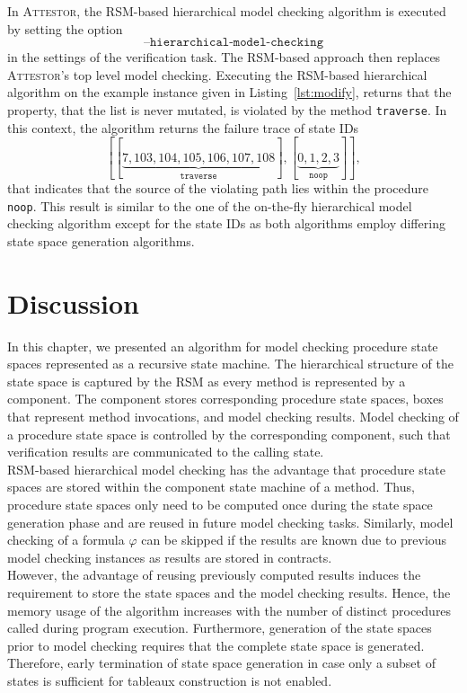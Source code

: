 \documentclass[a4paper, 12pt, twoside]{report}
\begin{document}
	In \textsc{Attestor}, the RSM-based hierarchical model checking algorithm is executed by setting the option \[\texttt{--hierarchical-model-checking}\] in the settings of the verification task. The RSM-based approach then replaces \textsc{Attestor}'s top level model checking.  Executing the RSM-based hierarchical algorithm on the example instance given in Listing~\ref{lst:modify}, returns that the property, that the list is never mutated, is violated by the method \texttt{traverse}. In this context, the algorithm returns the failure trace of state IDs \[[[\underbrace{7, 103, 104, 105, 106, 107, 108}_{\texttt{traverse}}], [\underbrace{0, 1, 2, 3}_{\texttt{noop}}]],\] that indicates that the source of the violating path lies within the procedure \texttt{noop}. This result is similar to the one of the on-the-fly hierarchical model checking algorithm except for the state IDs as both algorithms employ differing state space generation algorithms. 
	
	\section{Discussion}
	
	In this chapter, we presented an algorithm for model checking procedure state spaces represented as a recursive state machine. The hierarchical structure of the state space is captured by the RSM as every method is represented by a component. The component stores corresponding procedure state spaces, boxes that represent method invocations, and model checking results. Model checking of a procedure state space is controlled by the corresponding component, such that verification results are communicated to the calling state. \\
	
	RSM-based hierarchical model checking has the advantage that procedure state spaces are stored within the component state machine of a method. Thus, procedure state spaces only need to be computed once during the state space generation phase and are reused in future model checking tasks. Similarly, model checking of a formula $\varphi$ can be skipped if the results are known due to previous model checking instances as results are stored in contracts.\\	
	
	However, the advantage of reusing previously computed results induces the requirement to store the state spaces and the model checking results. Hence, the memory usage of the algorithm increases with the number of distinct procedures called during program execution. Furthermore, generation of the state spaces prior to model checking requires that the complete state space is generated. Therefore, early termination of state space generation in case only a subset of states is sufficient for tableaux construction is not enabled.\\	
	
\end{document}

